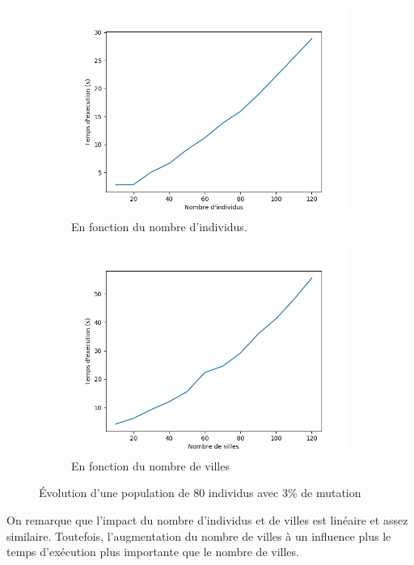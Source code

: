 \documentclass[12pt]{article}
\begin{document}
\begin{figure}[h]
    \begin{subfigure}{.5\textwidth}
        \includegraphics[width=.9\linewidth]{./time.png}
        \caption{En fonction du nombre d'individus.}
    \end{subfigure}
    \begin{subfigure}{.5\textwidth}
        \includegraphics[width=.9\linewidth]{./cities.png}
        \caption{En fonction du nombre de villes}
    \end{subfigure}
    \caption{Évolution d'une population de 80 individus avec 3\% de mutation}
\end{figure}

On remarque que l'impact du nombre d'individus et de villes est linéaire et assez similaire. Toutefois,
l'augmentation du nombre de villes à un influence plus le temps d'exécution plus importante que
le nombre de villes.
\end{document}
